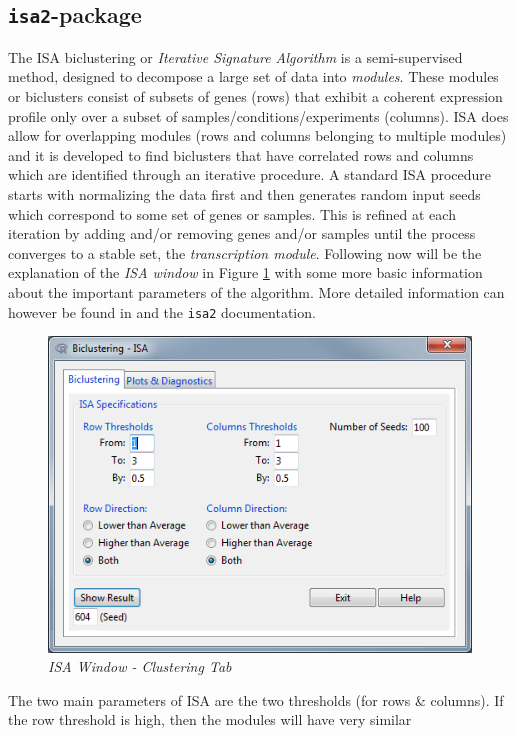 \documentclass[a4paper]{article}\usepackage[]{graphicx}\usepackage[]{color}
\begin{document}
\subsection{\texttt{isa2}-package}
The ISA biclustering or {\it Iterative Signature Algorithm} \citep{Bergman2003}
is a semi-supervised method, designed to decompose a large set of data into {\it
modules}. These modules or biclusters consist of subsets of genes (rows) that
exhibit a coherent expression profile only over a subset of
samples/conditions/experiments (columns). ISA does allow for overlapping modules
(rows and columns belonging to multiple modules) and it is developed to find
biclusters that have correlated rows and columns which are identified through an
iterative procedure. A standard ISA procedure starts with normalizing the data
first and then generates random input seeds which correspond to some set of
genes or samples. This is refined at each iteration by adding and/or removing
genes and/or samples until the process converges to a stable set, the {\it
transcription module}. Following now will be the explanation of the {\it ISA
window} in Figure \ref{isa_clusttab} with some more basic information about the
important parameters of the algorithm. More detailed information can however be
found in \citet{Bergman2003} and the \verb|isa2| documentation.
\begin{figure}[H]
\centering
\includegraphics[scale=0.5]{figures/isa_clusttab.png}
\caption{{\it ISA Window - Clustering Tab}\label{isa_clusttab}}
\end{figure}
\noindent The two main parameters of ISA are the two thresholds (for rows \&
columns). If the row threshold is high, then the modules will have very similar
\end{document}
